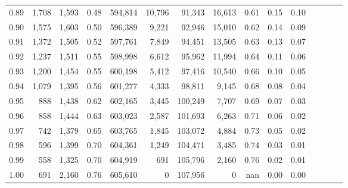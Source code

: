 \begin{tabular}{rrrcrrrrrrrrrrr}
0.89 &  1,708 &  1,593 &                                       0.48 &  594,814 &   10,796 &   91,343 &   16,613 &  0.61 &  0.15 &                         0.10 \\
0.90 &  1,575 &  1,603 &                                       0.50 &  596,389 &    9,221 &   92,946 &   15,010 &  0.62 &  0.14 &                         0.09 \\
0.91 &  1,372 &  1,505 &                                       0.52 &  597,761 &    7,849 &   94,451 &   13,505 &  0.63 &  0.13 &                         0.07 \\
0.92 &  1,237 &  1,511 &                                       0.55 &  598,998 &    6,612 &   95,962 &   11,994 &  0.64 &  0.11 &                         0.06 \\
0.93 &  1,200 &  1,454 &                                       0.55 &  600,198 &    5,412 &   97,416 &   10,540 &  0.66 &  0.10 &                         0.05 \\
0.94 &  1,079 &  1,395 &                                       0.56 &  601,277 &    4,333 &   98,811 &    9,145 &  0.68 &  0.08 &                         0.04 \\
0.95 &    888 &  1,438 &                                       0.62 &  602,165 &    3,445 &  100,249 &    7,707 &  0.69 &  0.07 &                         0.03 \\
0.96 &    858 &  1,444 &                                       0.63 &  603,023 &    2,587 &  101,693 &    6,263 &  0.71 &  0.06 &                         0.02 \\
0.97 &    742 &  1,379 &                                       0.65 &  603,765 &    1,845 &  103,072 &    4,884 &  0.73 &  0.05 &                         0.02 \\
0.98 &    596 &  1,399 &                                       0.70 &  604,361 &    1,249 &  104,471 &    3,485 &  0.74 &  0.03 &                         0.01 \\
0.99 &    558 &  1,325 &                                       0.70 &  604,919 &      691 &  105,796 &    2,160 &  0.76 &  0.02 &                         0.01 \\
1.00 &    691 &  2,160 &                                       0.76 &  605,610 &        0 &  107,956 &        0 &   nan &  0.00 &                         0.00 \\
\bottomrule
\end{tabular}

